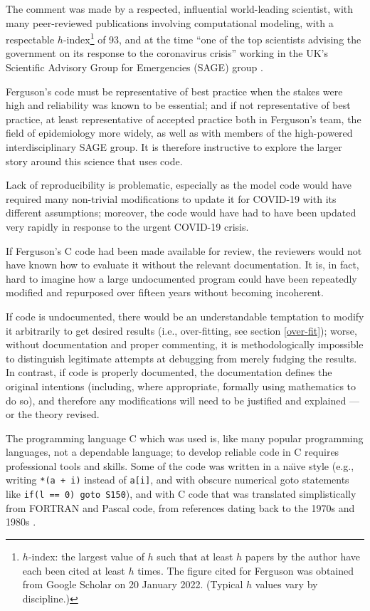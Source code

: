 \documentclass{comjnl}
\begin{document}
The comment was made by a respected, influential world-leading scientist, with many peer-reviewed publications involving computational modeling, with a respectable $h$-index\footnote{$h$-index: the largest value of $h$ such that at least $h$ papers by the author have each been cited at least $h$ times. The figure cited for Ferguson was obtained from Google Scholar on 20 January 2022. (Typical $h$ values vary by discipline.)} of 93, and at the time ``one of the top scientists advising the government on its response to the coronavirus crisis'' working in the UK's Scientific Advisory Group for Emergencies (SAGE) group \cite{ferguson-resign}. 

Ferguson's code must be representative of best practice when the stakes were high and reliability was known to be essential; and if not representative of best practice, at least representative of accepted practice both in Ferguson's team, the field of epidemiology more widely, as well as with members of the high-powered interdisciplinary SAGE group. It is therefore instructive to explore the larger story around this science that uses code. 

Lack of reproducibility is problematic, especially as the model code would have required many non-trivial modifications to update it for COVID-19 with its different assumptions; moreover, the code would have had to have been updated very rapidly in response to the urgent COVID-19 crisis. 

If Ferguson's C code had been made available for review, the reviewers would not have known how to evaluate it without the relevant documentation. It is, in fact, hard to imagine how a large undocumented program could have been repeatedly modified and repurposed over fifteen years without becoming incoherent. 

If code is undocumented, there would be an understandable temptation to modify it arbitrarily to get desired results (i.e., over-fitting, see section \ref{over-fit}); worse, without documentation and proper commenting, it is methodologically impossible to distinguish legitimate attempts at debugging from merely fudging the results. In contrast, if code is properly documented, the documentation defines the original intentions (including, where appropriate, formally using mathematics to do so), and therefore any modifications will need to be justified and explained --- or the theory revised.

The programming language C which was used \cite{tweet} is, like many popular programming languages, not a dependable language; to develop reliable code in C requires professional tools and skills. Some of the code was written in a na\"\i ve style (e.g., writing \texttt{*(a + i)} instead of \texttt{a[i]}, and with obscure numerical goto statements like \texttt{if(l == 0) goto S150}), and with C code that was translated simplistically from FORTRAN and Pascal code, from references dating back to the 1970s and 1980s .
\end{document}
